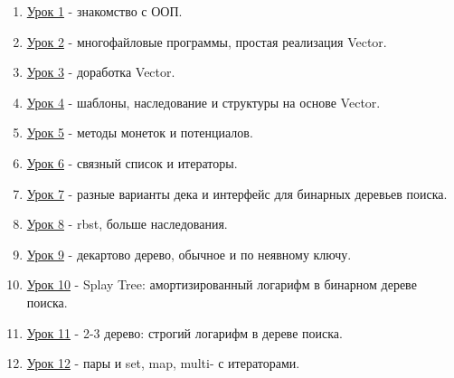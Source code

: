 \label{md2texREADME}
\begin{enumerate}
    \item \hyperref[md2tex1]{Урок 1} - знакомство с ООП.
    \item \hyperref[md2tex2]{Урок 2} - многофайловые программы, простая реализация Vector.
    \item \hyperref[md2tex3]{Урок 3} - доработка Vector.
    \item \hyperref[md2tex4]{Урок 4} - шаблоны, наследование и структуры на основе Vector.
    \item \hyperref[md2tex5]{Урок 5} - методы монеток и потенциалов.
    \item \hyperref[md2tex6]{Урок 6} - связный список и итераторы.
    \item \hyperref[md2tex7]{Урок 7} - разные варианты дека и интерфейс для бинарных деревьев поиска.
    \item \hyperref[md2tex8]{Урок 8} - rbst, больше наследования.
    \item \hyperref[md2tex9]{Урок 9} - декартово дерево, обычное и по неявному ключу.
    \item \hyperref[md2tex10]{Урок 10} - Splay Tree: амортизированный логарифм в бинарном дереве поиска.
    \item \hyperref[md2tex11]{Урок 11} - 2-3 дерево: строгий логарифм в дереве поиска.
    \item \hyperref[md2tex12]{Урок 12} - пары и set, map, multi- с итераторами.
\end{enumerate}
